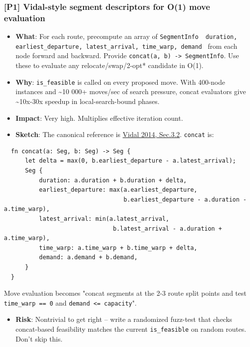 \documentclass[twocolumn,10pt,letterpaper]{article}
\begin{document}
\subsubsection{[P1] Vidal-style segment descriptors for O(1) move evaluation}
\begin{itemize}
\setlength{\itemsep}{0pt}
\setlength{\parskip}{0pt}
  \item \textbf{What}: For each route, precompute an array of \texttt{SegmentInfo { duration, earliest\_departure, latest\_arrival, time\_warp, demand }} from each node forward and backward. Provide \texttt{concat(a, b) -\allowbreak > SegmentInfo}. Use these to evaluate any relocate/swap/2-opt* candidate in O(1).
  \item \textbf{Why}: \texttt{is\_feasible} is called on every proposed move. With 400-node instances and \textasciitilde{}10 000+ moves/sec of search pressure, concat evaluators give \textasciitilde{}10x-30x speedup in local-search-bound phases.
  \item \textbf{Impact}: Very high. Multiplies effective iteration count.
  \item \textbf{Sketch}: The canonical reference is \href{https://www.sciencedirect.com/science/article/abs/pii/S0377221713005547}{Vidal 2014, Sec.3.2}. \texttt{concat} is:
\end{itemize}
\begin{lstlisting}
  fn concat(a: Seg, b: Seg) -> Seg {
      let delta = max(0, b.earliest_departure - a.latest_arrival);
      Seg {
          duration: a.duration + b.duration + delta,
          earliest_departure: max(a.earliest_departure,
                                  b.earliest_departure - a.duration - a.time_warp),
          latest_arrival: min(a.latest_arrival,
                               b.latest_arrival - a.duration + a.time_warp),
          time_warp: a.time_warp + b.time_warp + delta,
          demand: a.demand + b.demand,
      }
  }
\end{lstlisting}
  Move evaluation becomes "concat segments at the 2-3 route split points and test \texttt{time\_warp == 0} and \texttt{demand <= capacity}".

\begin{itemize}
\setlength{\itemsep}{0pt}
\setlength{\parskip}{0pt}
  \item \textbf{Risk}: Nontrivial to get right -- write a randomized fuzz-test that checks concat-based feasibility matches the current \texttt{is\_feasible} on random routes. Don't skip this.
\end{itemize}
\end{document}

